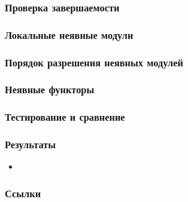 \documentclass{beamer}
\begin{document}
\begin{frame}\frametitle{Проверка завершаемости}

\end{frame}

\begin{frame}\frametitle{Локальные неявные модули}

\end{frame}

\begin{frame}\frametitle{Порядок разрешения неявных модулей}

\end{frame}

\begin{frame}\frametitle{Неявные функторы}

\end{frame}

\begin{frame}\frametitle{Тестирование и сравнение}

\end{frame}

\begin{frame}\frametitle{Результаты}
\begin{itemize}
    \item
\end{itemize}
\end{frame}

\appendix

\begin{frame}[allowframebreaks]\frametitle{Ссылки}
\printbibliography
\end{frame}
\end{document}
